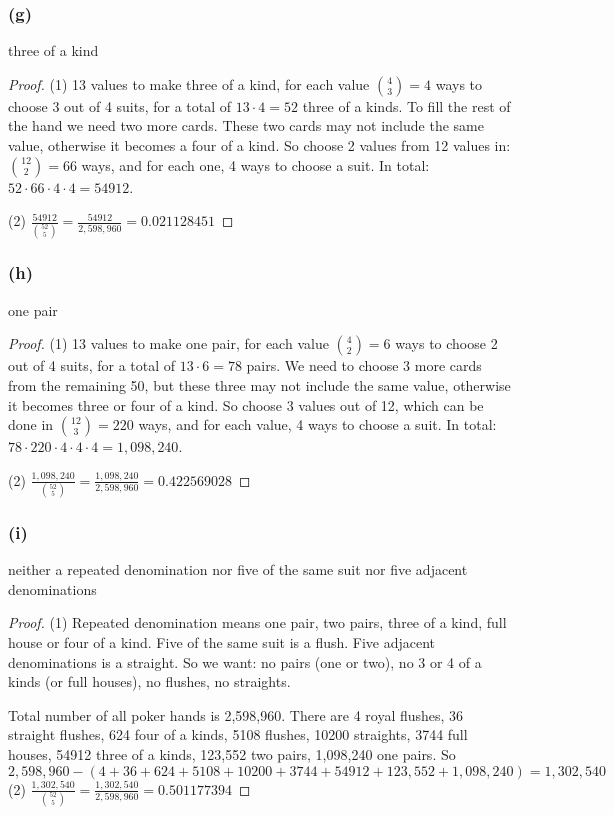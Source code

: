 \documentclass[14pt]{extarticle}
\newcommand{\dps}{\displaystyle}
\begin{document}
\subsubsection{(g)}
three of a kind

\begin{proof}
(1) 13 values to make three of a kind, for each value \(\binom{4}{3} = 4\) ways to choose 3 out of 4 suits, for a
total of \(13 \cdot 4 = 52\) three of a kinds. To fill the rest of the hand we need two more cards. These two cards may
not include the same value, otherwise it becomes a four of a kind. So choose 2 values from 12 values in: \(\binom{12}{2} = 
66\) ways, and for each one, 4 ways to choose a suit. In total: \(52 \cdot 66 \cdot 4 \cdot 4 = 54912\).

(2) \(\dps \frac{54912}{\binom{52}{5}} = \frac{54912}{2,598,960} = 0.021128451\)
\end{proof}

\subsubsection{(h)}
one pair

\begin{proof}
(1) 13 values to make one pair, for each value \(\binom{4}{2} = 6\) ways to choose 2 out of 4 suits, for a total of 
\(13 \cdot 6 = 78\) pairs. We need to choose 3 more cards from the remaining 50, but these three may not include the same
value, otherwise it becomes three or four of a kind. So choose 3 values out of 12, which can be done in \(\binom{12}{3} = 
220\) ways, and for each value, 4 ways to choose a suit. In total: \(78 \cdot 220 \cdot 4 \cdot 4 \cdot 4 = 1,098,240\).

(2) \(\dps \frac{1,098,240}{\binom{52}{5}} = \frac{1,098,240}{2,598,960} = 0.422569028\)
\end{proof}

\subsubsection{(i)}
neither a repeated denomination nor five of the same suit nor five adjacent denominations

\begin{proof}
(1) Repeated denomination means one pair, two pairs, three of a kind, full house or four of a kind. Five of the same suit is 
a flush. Five adjacent denominations is a straight. So we want: no pairs (one or two), no 3 or 4 of a kinds (or full 
houses), no flushes, no straights.

Total number of all poker hands is 2,598,960. There are 4 royal flushes, 36 straight flushes, 624 four of a kinds, 5108
flushes, 10200 straights, 3744 full houses, 54912 three of a kinds, 123,552 two pairs, 1,098,240 one pairs. So
\[
2,598,960 - (4 + 36 + 624 + 5108 + 10200 + 3744 + 54912 + 123,552 + 1,098,240) = 1,302,540
\]
(2) \(\dps \frac{1,302,540}{\binom{52}{5}} = \frac{1,302,540}{2,598,960} = 0.501177394\)
\end{proof}
\end{document}
